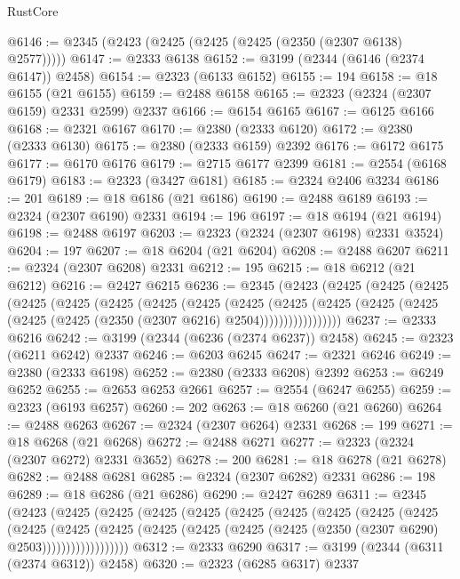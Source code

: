 \begin{lexlean}{RustCore}
\begin{coremodule}
@6146 := @2345 (@2423 (@2425 (@2425 (@2425 (@2350 (@2307 @6138) @2577)))))
@6147 := @2333 @6138
@6152 := @3199 (@2344 (@6146 (@2374 @6147)) @2458)
@6154 := @2323 (@6133 @6152)
@6155 := 194
@6158 := @18 @6155 (@21 @6155)
@6159 := @2488 @6158
@6165 := @2323 (@2324 (@2307 @6159) @2331 @2599) @2337
@6166 := @6154 @6165
@6167 := @6125 @6166
@6168 := @2321 @6167
@6170 := @2380 (@2333 @6120)
@6172 := @2380 (@2333 @6130)
@6175 := @2380 (@2333 @6159) @2392
@6176 := @6172 @6175
@6177 := @6170 @6176
@6179 := @2715 @6177 @2399
@6181 := @2554 (@6168 @6179)
@6183 := @2323 (@3427 @6181)
@6185 := @2324 @2406 @3234
@6186 := 201
@6189 := @18 @6186 (@21 @6186)
@6190 := @2488 @6189
@6193 := @2324 (@2307 @6190) @2331
@6194 := 196
@6197 := @18 @6194 (@21 @6194)
@6198 := @2488 @6197
@6203 := @2323 (@2324 (@2307 @6198) @2331 @3524)
@6204 := 197
@6207 := @18 @6204 (@21 @6204)
@6208 := @2488 @6207
@6211 := @2324 (@2307 @6208) @2331
@6212 := 195
@6215 := @18 @6212 (@21 @6212)
@6216 := @2427 @6215
@6236 := @2345
    (@2423
      (@2425
        (@2425
          (@2425
            (@2425
              (@2425
                (@2425
                  (@2425
                    (@2425
                      (@2425
                        (@2425
                          (@2425
                            (@2425 (@2425 (@2425 (@2425 (@2350 (@2307 @6216) @2504)))))))))))))))))
@6237 := @2333 @6216
@6242 := @3199 (@2344 (@6236 (@2374 @6237)) @2458)
@6245 := @2323 (@6211 @6242) @2337
@6246 := @6203 @6245
@6247 := @2321 @6246
@6249 := @2380 (@2333 @6198)
@6252 := @2380 (@2333 @6208) @2392
@6253 := @6249 @6252
@6255 := @2653 @6253 @2661
@6257 := @2554 (@6247 @6255)
@6259 := @2323 (@6193 @6257)
@6260 := 202
@6263 := @18 @6260 (@21 @6260)
@6264 := @2488 @6263
@6267 := @2324 (@2307 @6264) @2331
@6268 := 199
@6271 := @18 @6268 (@21 @6268)
@6272 := @2488 @6271
@6277 := @2323 (@2324 (@2307 @6272) @2331 @3652)
@6278 := 200
@6281 := @18 @6278 (@21 @6278)
@6282 := @2488 @6281
@6285 := @2324 (@2307 @6282) @2331
@6286 := 198
@6289 := @18 @6286 (@21 @6286)
@6290 := @2427 @6289
@6311 := @2345
    (@2423
      (@2425
        (@2425
          (@2425
            (@2425
              (@2425
                (@2425
                  (@2425
                    (@2425
                      (@2425
                        (@2425
                          (@2425
                            (@2425
                              (@2425
                                (@2425 (@2425 (@2425 (@2350 (@2307 @6290) @2503))))))))))))))))))
@6312 := @2333 @6290
@6317 := @3199 (@2344 (@6311 (@2374 @6312)) @2458)
@6320 := @2323 (@6285 @6317) @2337

\end{coremodule}
\end{lexlean}
